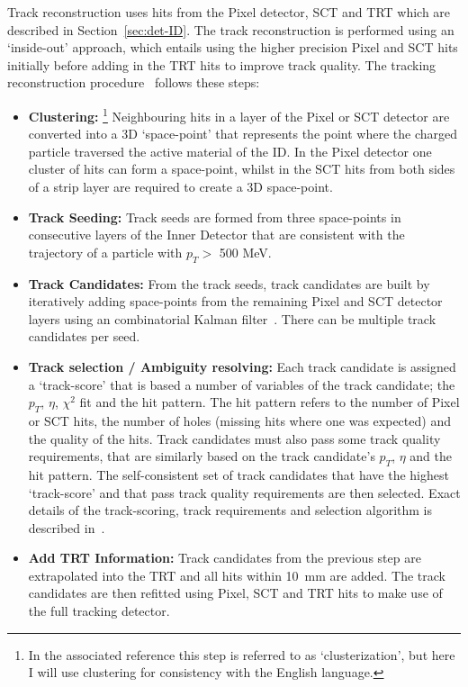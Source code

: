 Track reconstruction uses hits from the Pixel detector, SCT and TRT which are described in Section~\ref{sec:det-ID}.
The track reconstruction is performed using an `inside-out' approach,
which entails using the higher precision Pixel and SCT hits initially
before adding in the TRT hits to improve track quality.
The tracking reconstruction procedure~\cite{obj-tracks_TIDE} follows these steps:
\vspace{-0.5em}
\begin{itemize}[leftmargin=*]
\item\textbf{Clustering:}
  \footnote{In the associated reference this step is referred to as `clusterization', but here I will use clustering for consistency with the English language.}
  Neighbouring hits in a layer of the Pixel or SCT detector are converted into a 3D `space-point'
  that represents the point where the charged particle traversed the active material of the ID.
  In the Pixel detector one cluster of hits can form a space-point,
  whilst in the SCT hits from both sides of a strip layer are required to create a 3D space-point.\vspace{0.5em}
\item\textbf{Track Seeding:}
  Track seeds are formed from three space-points in consecutive layers of the Inner Detector
  that are consistent with the trajectory of a particle with $p_T >$ 500 MeV.\vspace{0.5em}
\item\textbf{Track Candidates:}
  From the track seeds, track candidates are built by iteratively adding space-points
  from the remaining Pixel and SCT detector layers using an combinatorial Kalman filter~\cite{obj-tracks_kal}.
  There can be multiple track candidates per seed.\vspace{0.5em}
\item\textbf{Track selection / Ambiguity resolving:}
  Each track candidate is assigned a `track-score' that is based a number of variables of the track candidate;
  the $p_T$, $\eta$, $\chi^{2}$ fit and the hit pattern.
  The hit pattern refers to the number of Pixel or SCT hits,
  the number of holes (missing hits where one was expected)
  and the quality of the hits.
  Track candidates must also pass some track quality requirements,
  that are similarly based on the track candidate's $p_T$, $\eta$ and the hit pattern.
  The self-consistent set of track candidates that have the highest `track-score' and that pass track quality requirements are then selected.
  Exact details of the track-scoring, track requirements and selection algorithm is described in~\cite{obj-tracks_TIDE}.\vspace{0.5em}
\item\textbf{Add TRT Information:}
  Track candidates from the previous step are extrapolated into the TRT and all hits within \SI{10}{\milli\metre} are added.
  The track candidates are then refitted using Pixel, SCT and TRT hits to make use of the full tracking detector.
\end{itemize}


